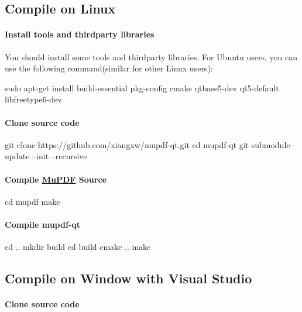 \subsection*{Compile on Linux}

\paragraph*{Install tools and thirdparty libraries}

You should install some tools and thirdparty libraries. For Ubuntu users, you can use the following command(similar for other Linux users)\-: \begin{DoxyVerb}sudo apt-get install build-essential pkg-config cmake qtbase5-dev qt5-default libfreetype6-dev
\end{DoxyVerb}


\paragraph*{Clone source code}

\begin{DoxyVerb}git clone https://github.com/xiangxw/mupdf-qt.git
cd mupdf-qt
git submodule update --init --recursive
\end{DoxyVerb}


\paragraph*{Compile \hyperlink{namespace_mu_p_d_f}{Mu\-P\-D\-F} Source}

\begin{DoxyVerb}cd mupdf
make
\end{DoxyVerb}


\paragraph*{Compile mupdf-\/qt}

\begin{DoxyVerb}cd ..
mkdir build
cd build
cmake ..
make
\end{DoxyVerb}


\subsection*{Compile on Window with Visual Studio}

\paragraph*{Clone source code}

